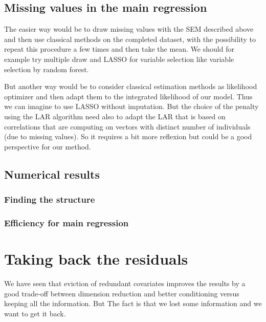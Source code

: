 \documentclass[11pt,a4paper]{report}
\begin{document}
%	
					
			
			
	\section{Missing values in the main regression}
		The easier way would be to draw missing values with the SEM described above and then use classical methods on the completed dataset, with the possibility to repeat this procedure a few times and then take the mean. We should for example try multiple draw and LASSO for variable selection like variable selection by random forest.
		
		But another way would be to consider classical estimation methods as likelihood optimizer and then adapt them to the integrated likelihood of our model. Thus we can imagine to use LASSO without imputation. But the choice of the penalty using the LAR algorithm need also to adapt the LAR that is based on correlations that are computing on vectors with distinct number of individuals (due to missing values). So it requires a bit more reflexion but could be a good perspective for our method.
	\section{Numerical results}
		\subsection{Finding the structure}
		\subsection{Efficiency for main regression}
\chapter{Taking back the residuals}
	We have seen that eviction of redundant covariates improves the results by a good trade-off between dimension reduction and better conditioning versus keeping all the information. But The fact is that we lost some information and we want to get it back.
\end{document}
